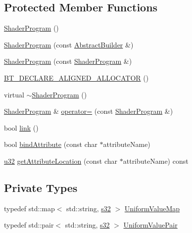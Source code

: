 \subsection*{Protected Member Functions}
\begin{DoxyCompactItemize}
\item 
\mbox{\hyperlink{classnjli_1_1_shader_program_a5def475147030f4b08273f0dc0d8d0eb}{Shader\+Program}} ()
\item 
\mbox{\hyperlink{classnjli_1_1_shader_program_a46ab4a8c88ca20c55202c9a152a57838}{Shader\+Program}} (const \mbox{\hyperlink{classnjli_1_1_abstract_builder}{Abstract\+Builder}} \&)
\item 
\mbox{\hyperlink{classnjli_1_1_shader_program_a45a93b1279f11a5323e28070ccc778a8}{Shader\+Program}} (const \mbox{\hyperlink{classnjli_1_1_shader_program}{Shader\+Program}} \&)
\item 
\mbox{\hyperlink{classnjli_1_1_shader_program_a091874e0063dade5799d8061f156fe3c}{B\+T\+\_\+\+D\+E\+C\+L\+A\+R\+E\+\_\+\+A\+L\+I\+G\+N\+E\+D\+\_\+\+A\+L\+L\+O\+C\+A\+T\+OR}} ()
\item 
virtual \mbox{\hyperlink{classnjli_1_1_shader_program_a8b08a64a5724aba5cc614c2288846044}{$\sim$\+Shader\+Program}} ()
\item 
\mbox{\hyperlink{classnjli_1_1_shader_program}{Shader\+Program}} \& \mbox{\hyperlink{classnjli_1_1_shader_program_aba28741515ef99ccd725473aadd26a93}{operator=}} (const \mbox{\hyperlink{classnjli_1_1_shader_program}{Shader\+Program}} \&)
\item 
bool \mbox{\hyperlink{classnjli_1_1_shader_program_add1203b770ecde00cf3089433cdc372e}{link}} ()
\item 
bool \mbox{\hyperlink{classnjli_1_1_shader_program_a0f30cbd74175ed6967bafc46b35bb928}{bind\+Attribute}} (const char $\ast$attribute\+Name)
\item 
\mbox{\hyperlink{_util_8h_a10e94b422ef0c20dcdec20d31a1f5049}{u32}} \mbox{\hyperlink{classnjli_1_1_shader_program_a44caba1039485701689f734de28462e7}{get\+Attribute\+Location}} (const char $\ast$attribute\+Name) const
\end{DoxyCompactItemize}
\subsection*{Private Types}
\begin{DoxyCompactItemize}
\item 
typedef std\+::map$<$ std\+::string, \mbox{\hyperlink{_util_8h_aa62c75d314a0d1f37f79c4b73b2292e2}{s32}} $>$ \mbox{\hyperlink{classnjli_1_1_shader_program_a36ecea1b480769cf2a125e5fb13f122a}{Uniform\+Value\+Map}}
\item 
typedef std\+::pair$<$ std\+::string, \mbox{\hyperlink{_util_8h_aa62c75d314a0d1f37f79c4b73b2292e2}{s32}} $>$ \mbox{\hyperlink{classnjli_1_1_shader_program_a784188d8ab62d1eb541432ce756689a9}{Uniform\+Value\+Pair}}
\end{DoxyCompactItemize}
